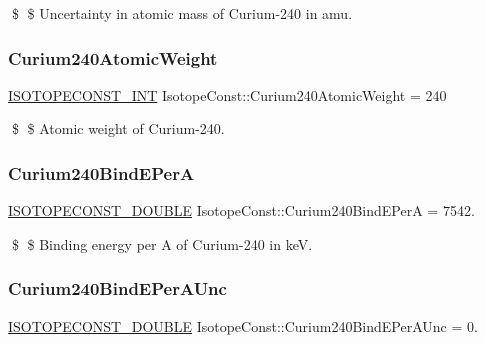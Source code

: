 \$ \$ Uncertainty in atomic mass of Curium-\/240 in amu. \mbox{\label{group___isotope_const-_curium-_cm240_ga646ca958e14ba3f5cb82f4f904622c97}} 
\subsubsection{\texorpdfstring{Curium240\+Atomic\+Weight}{Curium240AtomicWeight}}
{\footnotesize\ttfamily \mbox{\hyperlink{group___isotope_const-_macros_ga5f18360b3e99483a35c32d789e62621c}{I\+S\+O\+T\+O\+P\+E\+C\+O\+N\+S\+T\+\_\+\+I\+NT}} Isotope\+Const\+::\+Curium240\+Atomic\+Weight = 240}

\$ \$ Atomic weight of Curium-\/240. \mbox{\label{group___isotope_const-_curium-_cm240_ga2ddcb105a1093c30923bfaf07a877fc4}} 
\subsubsection{\texorpdfstring{Curium240\+Bind\+E\+PerA}{Curium240BindEPerA}}
{\footnotesize\ttfamily \mbox{\hyperlink{group___isotope_const-_macros_ga8f45a7272ce02c0b4c65c44636ed719a}{I\+S\+O\+T\+O\+P\+E\+C\+O\+N\+S\+T\+\_\+\+D\+O\+U\+B\+LE}} Isotope\+Const\+::\+Curium240\+Bind\+E\+PerA = 7542.}

\$ \$ Binding energy per A of Curium-\/240 in keV. \mbox{\label{group___isotope_const-_curium-_cm240_ga75439918a8d5528f85c90acebc9ed105}} 
\subsubsection{\texorpdfstring{Curium240\+Bind\+E\+Per\+A\+Unc}{Curium240BindEPerAUnc}}
{\footnotesize\ttfamily \mbox{\hyperlink{group___isotope_const-_macros_ga8f45a7272ce02c0b4c65c44636ed719a}{I\+S\+O\+T\+O\+P\+E\+C\+O\+N\+S\+T\+\_\+\+D\+O\+U\+B\+LE}} Isotope\+Const\+::\+Curium240\+Bind\+E\+Per\+A\+Unc = 0.}

